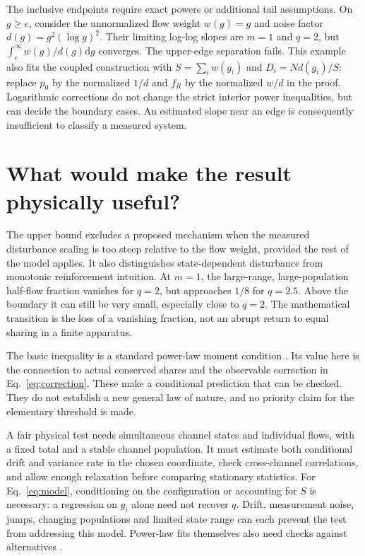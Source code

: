 \documentclass[11pt,a4paper]{article}
\newcommand{\dd}{\mathrm{d}}
\begin{document}
The inclusive endpoints require exact powers or additional tail assumptions.
On $g\geq e$, consider the unnormalized flow weight $w(g)=g$ and noise factor
$d(g)=g^2(\log g)^2$. Their limiting log-log slopes are $m=1$ and $q=2$, but
$\int_e^\infty w(g)/d(g)\dd g$ converges. The upper-edge separation fails.
This example also fits the coupled construction with $S=\sum_i w(g_i)$ and
$D_i=N d(g_i)/S$: replace $p_0$ by the normalized $1/d$ and $f_R$ by the
normalized $w/d$ in the proof. Logarithmic corrections do not change the strict
interior power inequalities, but can decide the boundary cases. An estimated
slope near an edge is consequently insufficient to classify a measured system.

\section{What would make the result physically useful?}

The upper bound excludes a proposed mechanism when the measured disturbance
scaling is too steep relative to the flow weight, provided the rest of the model
applies. It also distinguishes state-dependent disturbance from monotonic
reinforcement intuition. At $m=1$, the large-range, large-population half-flow
fraction vanishes for $q=2$, but approaches $1/8$ for $q=2.5$.
Above the boundary it can still be very small, especially close to $q=2$.
The mathematical transition is the loss of a vanishing fraction, not an abrupt
return to equal sharing in a finite apparatus.

The basic inequality is a standard power-law moment condition \cite{newman}.
Its value here is the connection to actual conserved shares and the observable
correction in Eq.~\eqref{eq:correction}. These make a conditional prediction
that can be checked. They do not establish a new general law of nature, and no
priority claim for the elementary threshold is made.

A fair physical test needs simultaneous channel states and individual flows,
with a fixed total and a stable channel population. It must estimate both
conditional drift and variance rate in the chosen coordinate, check cross-channel
correlations, and allow enough relaxation before comparing stationary statistics.
For Eq.~\eqref{eq:model}, conditioning on the configuration or accounting for $S$
is necessary: a regression on $g_i$ alone need not recover $q$. Drift, measurement
noise, jumps, changing populations and limited state range can each prevent the
test from addressing this model. Power-law fits themselves also need checks
against alternatives \cite{clauset}.
\end{document}
